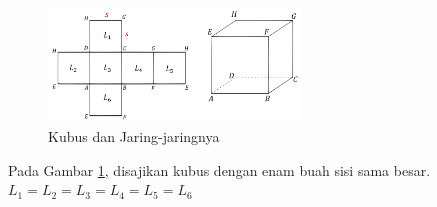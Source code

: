 \documentclass[12pt]{article}
\begin{document}
\begin{enumerate}
\begin{enumerate}
        \begin{figure}[H]
            \centering
            \includegraphics[width=0.6\textwidth]{images/kubusdanjaring.png}
            \caption{Kubus dan Jaring-jaringnya}
            \label{kubusjaring}
        \end{figure}
        \hspace*{1cm}Pada Gambar \ref{kubusjaring}, disajikan kubus dengan enam buah sisi sama besar.\\
        \( L_1 = L_2 = L_3 = L_4 = L_5 = L_6 \)


\end{enumerate}
\end{enumerate}
\end{document}
